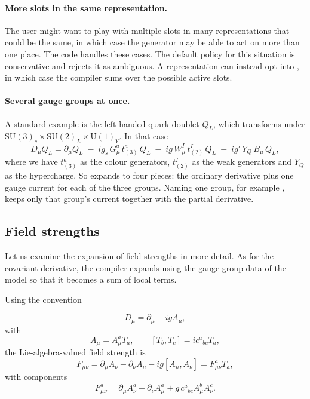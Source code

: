 \paragraph{More slots in the same representation.} The user might want to play with multiple slots in many representations that could be the same, in which case the generator may be able to act on more than one place. The code handles these cases. The default policy for this situation is conservative and rejects it as ambiguous.
 A representation can instead opt into , in which case the compiler sums over the possible active slots.

\paragraph{Several gauge groups at once.} A standard example is the left-handed quark doublet $Q_L$, which transforms under $\mathrm{SU}(3)_c\times\mathrm{SU}(2)_L\times\mathrm{U}(1)_Y$. In that case
\begin{equation}
    D_\mu Q_L
    = \partial_\mu Q_L
    \;-\; i g_s\, G^a_\mu\, t^a_{(3)}\,Q_L
    \;-\; i g\, W^I_\mu\, t^I_{(2)}\,Q_L
    \;-\; i g'\, Y_{Q}\, B_\mu\, Q_L ,
    \label{eq:covd-multigroup}
\end{equation}
where we have $t^a_{(3)}$ as the colour generators, $t^I_{(2)}$ as the weak generators and $Y_Q$ as the hypercharge. So  expands to four pieces: the ordinary derivative plus one gauge current for each of the three groups. Naming one group, for example , keeps only that group's current together with the partial derivative.



\subsection{Field strengths}
\label{sec:internals-fs}

Let us examine the expansion of field strengths in more detail. As for the covariant derivative, the compiler expands  using the gauge-group data of the model so that it becomes a sum of local terms.

Using the convention

\begin{equation}
    D_\mu = \partial_\mu - i g A_\mu,
\end{equation}
with
\begin{equation}
    A_\mu = A_\mu^a T_a,
    \qquad
    [T_b,T_c] = i c^{a}{}_{bc} T_a,
\end{equation}
the Lie-algebra-valued field strength is
\begin{equation}
    F_{\mu\nu}
    =
    \partial_\mu A_\nu
    -
    \partial_\nu A_\mu
    -
    i g [A_\mu,A_\nu]
    =
    F^a_{\mu\nu}T_a,
\end{equation}
with components
\begin{equation}
    F^a_{\mu\nu}
    =
    \partial_\mu A^a_\nu
    -
    \partial_\nu A^a_\mu
    +
    g\,c^{a}{}_{bc}A^b_\mu A^c_\nu.
    \label{eq:fs-general}
\end{equation}


